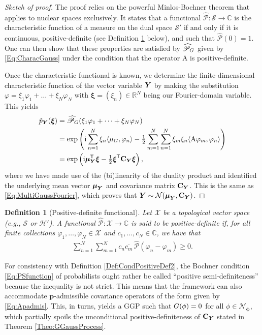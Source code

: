\documentclass[11pt, english,english]{article}
\newtheorem{definition}{Definition}
\newcommand{\C}{ \mathbb{C}}
\newcommand{\R}{ \mathbb{R}}
\def\V#1{{\boldsymbol{#1}}}         %
\def\Spc#1{{\mathcal{#1}}}  %
\def\M#1{{\bf{#1}}}  %
\def\Op#1{{\mathrm{#1}}}  %
\def\jj{\mathrm{i}}
\def\Prob{\mathscr{P}}
\def\Form{\widehat{\Prob}}
\renewcommand{\[}{\begin{equation}}
\renewcommand{\]}[1]{\label{eq:#1}\end{equation}}
\def\Prob{\mathscr{P}}
\def\Form{\widehat{\Prob}}
\def\wRand{\xi}
\def\bwRand{{\boldsymbol \xi}}
\def\VRand#1{{\uppercase{\boldsymbol #1}}}         %
\def\gRand#1{{\uppercase{ #1}}}         %
\newcommand{\Tr}{\mathsf{T}}
\begin{document}
\begin{proof}[\small Sketch of proof]
{\small
The proof relies on the powerful Minlos-Bochner theorem that applies to nuclear spaces exclusively. It states that a functional $\Form: \Spc S \to \C$ is the characteristic function of a measure on the dual space $\Spc S'$ if and only if it is continuous, positive-definite (see Definition \ref{Def:PDFunctional} below), and such that $\Form(0)=1$. One can then show that these properties are satisfied by $\Form_{\gRand g}$ given by \eqref{Eq:CharacGauss} under the condition that the operator $\Op A$ is positive-definite. 

Once the characteristic functional is known, we determine the finite-dimensional
characteristic function of the vector variable $\VRand Y$ by making the substitution $\varphi=
\wRand_1 \varphi_1+\dots+\wRand_N \varphi_N$ with $\bwRand=(\wRand_n) \in \R^N$ being our Fourier-domain variable. This yields 
\begin{align*}
\hat p_{\VRand y}(\bwRand)&=\Form_{\gRand g}(\wRand_1 \varphi_1+\dots+\wRand_N \varphi_N)\\
&=\exp\left(\jj \sum_{n=1}^N\wRand_n \langle \mu_{\gRand g}, \varphi_n\rangle-\tfrac{1}{2} \sum_{m=1}^N\sum_{n=1}^N\wRand_m\wRand_n\langle\Op A \varphi_m,\varphi_n\rangle\right)\\
&=\exp\left(\jj  \V \mu_{\VRand Y}^\Tr\bwRand-\tfrac{1}{2} \bwRand^\Tr \M C_{\VRand Y} \bwRand\right),
\end{align*}
where we have made use of the (bi)linearity of the duality product and identified
the underlying mean vector $\V \mu_{\VRand Y}$ and covariance  matrix $\M C_{\VRand Y}$.
This is the same as \eqref{Eq:MultiGaussFourier}, which proves that $\VRand y\sim\Spc N(\V \mu_{\VRand Y},\M C_{\VRand Y})$.
} %
\end{proof}
\begin{definition}[Positive-definite functional]  
\label{Def:PDFunctional}
Let $\Spc X$ be a topological vector space (e.g., $\Spc S$ or $\Spc H'$).  
A functional $\widehat{\mathscr{P}} : \Spc X \to \C$ is said to be \emph{positive-definite} if, for all finite collections $\varphi_1, \dots, \varphi_N \in \Spc X$ and $c_1, \dots, c_N \in \mathbb{C}$, we have that\begin{align}
\label{Eq:PSfunction}
\sum_{n=1}^N \sum_{m=1}^N c_n \overline{c_m} \, \widehat{\mathscr{P}}(\varphi_n - \varphi_m) \geq 0.
\end{align}
\end{definition}
For consistency with Definition \ref{Def:CondPositiveDef2}, the Bochner condition \eqref{Eq:PSfunction} of probabilists ought rather be called ``positive semi-definiteness'' because the inequality is not strict. This means that the framework can also accommodate $\V p$-admissible covariance operators of the form given by  \eqref{Eq:Apadmis}.
This, in turns, yields a GGP such that $\gRand g(\phi)=0$ for all $\phi \in \Spc N_{\V \phi}$, which partially spoils the unconditional positive-definiteness of $\M C_{\VRand Y}$ stated in Theorem \ref{Theo:GGaussProcess}.
\end{document}
